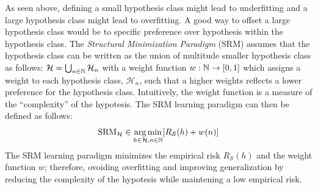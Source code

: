 As seen above, defining a small hypothesis class might lead to underfitting and a large hypothesis class might lead to overfitting.
A good way to offset a large hypothesis class would be to specific preference over hypothesis within the hypothesis class.
The \emph{Structural Minimization Paradigm} (SRM) assumes that the hypothesis class can be written as the union of multitude smaller hypothesis class as follows: $\mathcal{H} = \bigcup_{n \in \mathbb{N}} \mathcal{H}_n$ with a weight function $w: \mathbb{N} \rightarrow [0, 1]$ which assigns a weight to each hypothesis class, $\mathcal{H}_n$, such that a higher weights reflects a lower preference for the hypothesis class.
Intuitively, the weight function is a measure of the ``complexity'' of the hypotesis.
The SRM learning paradigm can then be defined as follows:
\begin{equation}
  \text{SRM}_\mathcal{H} \in \argmin_{h \in \mathcal{H}, n \in \Nbb} \left[ R_\mathcal{S}(h) + w(n) \right]
\end{equation}
The SRM learning paradigm minimizes the empirical risk $R_\mathcal{S}(h)$ and the weight function $w$; therefore, ovoiding overfitting and improving generalization by reducing the complexity of the hypotesis while maintening a low empirical risk. 









%
%


